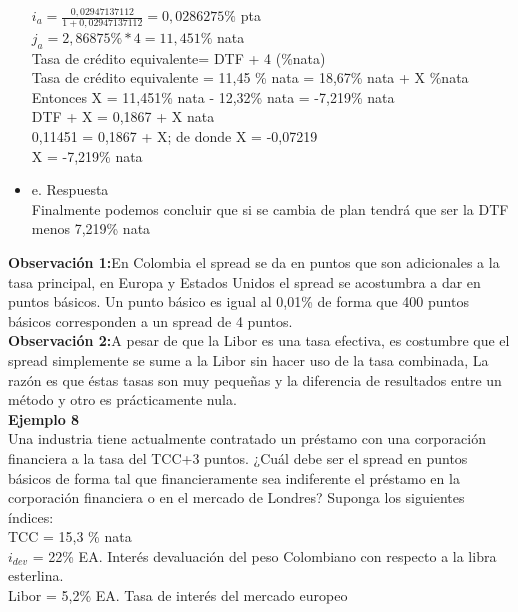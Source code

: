 \begin{itemize}
		$i_{a}= \frac{0,02947137112}{1+0,02947137112} = 0,0286275\%$ pta\\
		$j_{a} = 2,86875\% * 4 = 11,451\%$ nata\\
		
		Tasa de crédito equivalente= DTF + 4 (\%nata) \\
        Tasa de crédito equivalente = 11,45 \% nata = 18,67\% nata + X \%nata \\
        Entonces X = 11,451\% nata - 12,32\% nata = -7,219\% nata \\
		DTF + X = 0,1867 + X nata \\
		0,11451 = 0,1867 + X; de donde X = -0,07219 \\
		X = -7,219\% nata\\
		
		\item e. Respuesta\\
		
		Finalmente podemos concluir que si se cambia de plan tendrá que ser la DTF menos 	7,219\%	nata\\
		
	\end{itemize}
	
	\textbf{Observación 1:}En Colombia el spread se da en puntos que son adicionales a la tasa principal, en Europa y Estados Unidos el spread se acostumbra a dar en puntos básicos. Un punto básico es igual al 0,01\% de forma que 400 puntos básicos corresponden a un spread de 4 puntos.\\
	
	\textbf{Observación 2:}A pesar de que la Libor es una tasa efectiva, es costumbre que el spread simplemente se sume a la Libor sin hacer uso de la tasa combinada, La razón es que éstas tasas son muy pequeñas y la diferencia de resultados entre un método y otro es prácticamente nula.\\
	
	\textbf{Ejemplo 8}\\
	Una industria tiene actualmente contratado un préstamo con una corporación financiera a la tasa del TCC+3 puntos. ¿Cuál debe ser el spread en puntos básicos de forma tal que financieramente sea indiferente el préstamo en la corporación financiera o en el mercado de Londres? Suponga los siguientes índices: \\
	
	TCC = 15,3 \% nata \\
    $i_{dev}$ = 22\% EA. Interés devaluación del peso Colombiano con respecto a la libra esterlina. \\
    Libor = 5,2\% EA. Tasa de interés del mercado europeo \\
	
